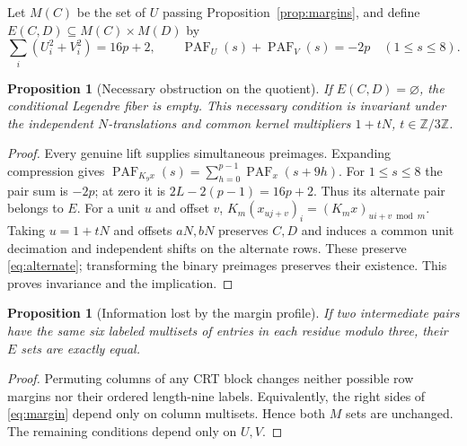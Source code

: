 \documentclass[11pt]{article}
\newtheorem{proposition}[theorem]{Proposition}
\newcommand{\PAF}{\operatorname{PAF}}
\newcommand{\Z}{\mathbb Z}
\begin{document}
Let $M(C)$ be the set of $U$ passing Proposition~\ref{prop:margins}, and
define $E(C,D)\subseteq M(C)\times M(D)$ by
\begin{equation}\label{eq:alternate}
 \sum_i(U_i^2+V_i^2)=16p+2,\qquad
 \PAF_U(s)+\PAF_V(s)=-2p\quad(1\leq s\leq8).
\end{equation}
\begin{proposition}[Necessary obstruction on the quotient]
If $E(C,D)=\varnothing$, the conditional Legendre fiber is empty.
This necessary condition is invariant under the independent $N$-translations
and common kernel multipliers $1+tN$, $t\in\Z/3\Z$.
\end{proposition}
\begin{proof}
Every genuine lift supplies simultaneous preimages. Expanding compression
gives $\PAF_{K_9x}(s)=\sum_{h=0}^{p-1}\PAF_x(s+9h)$.
For $1\leq s\leq8$ the pair sum is $-2p$; at zero it is
$2L-2(p-1)=16p+2$. Thus its alternate pair belongs to $E$.
For a unit $u$ and offset $v$,
$K_m(x_{u j+v})_i=(K_mx)_{u i+v\bmod m}$.
Taking $u=1+tN$ and offsets $aN,bN$ preserves $C,D$ and induces a
common unit decimation and independent shifts on the alternate rows.
These preserve \eqref{eq:alternate}; transforming the binary preimages
preserves their existence. This proves invariance and the implication.
\end{proof}

\begin{proposition}[Information lost by the margin profile]\label{prop:profile}
If two intermediate pairs have the same six labeled multisets of entries
in each residue modulo three, their $E$ sets are exactly equal.
\end{proposition}
\begin{proof}
Permuting columns of any CRT block changes neither possible row margins
nor their ordered length-nine labels. Equivalently, the right sides of
\eqref{eq:margin} depend only on column multisets. Hence both $M$ sets
are unchanged. The remaining conditions depend only on $U,V$.
\end{proof}
\end{document}
